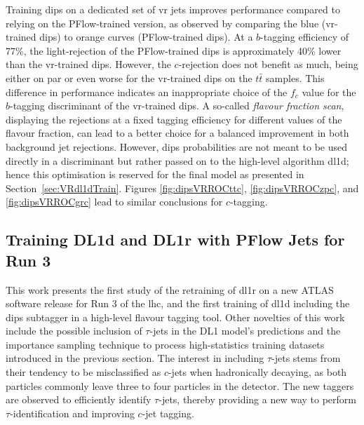 Training \gls{dips} on a dedicated set of \gls{vr} jets improves performance compared to relying on the PFlow-trained version, as observed by comparing the blue (\gls{vr}-trained \gls{dips}) to orange curves (PFlow-trained \gls{dips}). At a $b$-tagging efficiency of 77\%, the light-rejection of the PFlow-trained \gls{dips} is approximately 40\% lower than the \gls{vr}-trained \gls{dips}. However, the $c$-rejection does not benefit as much, being either on par or even worse for the \gls{vr}-trained \gls{dips} on the $t\bar{t}$ samples. This difference in performance indicates an inappropriate choice of the $f_c$ value for the $b$-tagging discriminant of the \gls{vr}-trained \gls{dips}. A so-called \textit{flavour fraction scan}, displaying the rejections at a fixed tagging efficiency for different values of the flavour fraction, can lead to a better choice for a balanced improvement in both background jet rejections. However, \gls{dips} probabilities are not meant to be used directly in a discriminant but rather passed on to the high-level algorithm \gls{dl1d}; hence this optimisation is reserved for the final model as presented in Section~\ref{sec:VRdl1dTrain}. Figures \ref{fig:dipsVRROCttc}, \ref{fig:dipsVRROCzpc}, and \ref{fig:dipsVRROCgrc} lead to similar conclusions for $c$-tagging.

\subsection{Training DL1d and DL1r with PFlow Jets for Run 3}
This work presents the first study of the retraining of \gls{dl1r} on a new ATLAS software release for Run 3 of the \gls{lhc}, and the first training of \gls{dl1d} including the \gls{dips} subtagger in a high-level flavour tagging tool. Other novelties of this work include the possible inclusion of $\tau$-jets in the DL1 model's predictions and the importance sampling technique to process high-statistics training datasets introduced in the previous section. The interest in including $\tau$-jets stems from their tendency to be misclassified as $c$-jets when hadronically decaying, as both particles commonly leave three to four particles in the detector. The new taggers are observed to efficiently identify $\tau$-jets, thereby providing a new way to perform $\tau$-identification and improving $c$-jet tagging.\\ %

